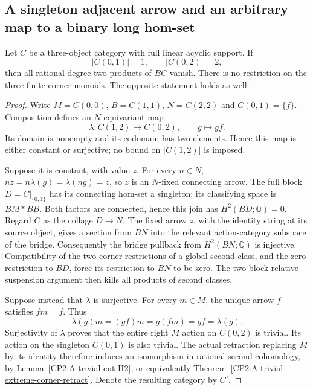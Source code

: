 \subsection{A singleton adjacent arrow and an arbitrary map to a binary long hom-set}

\begin{proposition}
\label{CP2:A-singleton-adjacent-binary-long}
Let $C$ be a three-object category with full linear acyclic support.
If
\[
 |C(0,1)|=1,\qquad |C(0,2)|=2,
\]
then all rational degree-two products of $BC$ vanish.  There is
no restriction on the three finite corner monoids.  The opposite
statement holds as well.
\end{proposition}
\begin{proof}
Write $M=C(0,0)$, $B=C(1,1)$, $N=C(2,2)$ and
$C(0,1)=\{f\}$.  Composition defines an $N$-equivariant map
\[
 \lambda:C(1,2)\longrightarrow C(0,2),\qquad g\longmapsto gf.
\]
Its domain is nonempty and its codomain has two elements.  Hence
this map is either constant or surjective; no bound on $|C(1,2)|$
is imposed.

Suppose it is constant, with value $z$.  For every $n\in N$,
$nz=n\lambda(g)=\lambda(ng)=z$, so $z$ is an $N$-fixed
connecting arrow.  The full block $D=C|_{\{0,1\}}$ has its
connecting hom-set a singleton; its classifying space is
$BM*BB$.  Both factors are connected, hence this join has
$H^2(BD;\mathbb Q)=0$.  Regard $C$ as the collage $D\to N$.
The fixed arrow $z$, with the identity string at its source object,
gives a section from $BN$ into the relevant action-category
subspace of the bridge.  Consequently the bridge pullback from
$H^2(BN;\mathbb Q)$ is injective.  Compatibility of the two
corner restrictions of a global second class, and the zero
restriction to $BD$, force its restriction to $BN$ to be zero.
The two-block relative-suspension argument then kills all products
of second classes.

Suppose instead that $\lambda$ is surjective.  For every $m\in M$,
the unique arrow $f$ satisfies $fm=f$.  Thus
\[
       \lambda(g)m=(gf)m=g(fm)=gf=\lambda(g).
\]
Surjectivity of $\lambda$ proves that the entire right $M$ action
on $C(0,2)$ is trivial.  Its action on the singleton $C(0,1)$
is also trivial.  The actual retraction replacing $M$ by its
identity therefore induces an isomorphism in rational second
cohomology, by Lemma~\ref{CP2:A-trivial-cut-H2}, or equivalently
Theorem~\ref{CP2:A-trivial-extreme-corner-retract}.
Denote the resulting category by $C'$.


\end{proof}
